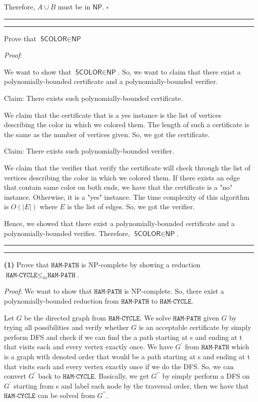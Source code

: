 \documentclass[a4paper, 11pt]{article}
\newcommand{\question}[2] {\vspace{.25in} \hrule\vspace{0.5em}
	\noindent{\bf #1: #2} \vspace{0.5em}
	\hrule \vspace{.10in}}
\renewcommand{\part}[1] {\vspace{.10in} {\bf (#1)}}
\begin{document}
	Therefore, $A \cup B$ must be in $\textsf{NP}$.
	$\square$
	
	\question{3}{This is NP}
	
	Prove that $\textsf{5COLOR} \in \textsf{NP}$
	
	{\em Proof}: 
	
	We want to show that $\textsf{5COLOR} \in \textsf{NP}$. So, we want to claim that there exist a polynomially-bounded certificate and a polynomially-bounded verifier.
	
	Claim: There exists such polynomially-bounded certificate.
	
	We claim that the certificate that is a yes instance is the list of vertices describing the color in which we colored them. The length of such a certificate is the same as the number of vertices given. So, we got the certificate.
	
	Claim: There exists such polynomially-bounded verifier.
	
	We claim that the verifier that verify the certificate will check through the list of vertices describing the color in which we colored them. If there exists an edge that contain same color on both ends, we have that the certificate is a "no" instance. Otherwise, it is a "yes" instance. The time complexity of this algorithm is $O(|E|)$ where $E$ is the list of edges. So, we got the verifier.
	
	Hence, we showed that there exist a polynomially-bounded certificate and a polynomially-bounded verifier. Therefore, $\textsf{5COLOR} \in \textsf{NP}$.
		
	\question{4}{NP-Complete}
	
	\part{1} Prove that $\texttt{HAM-PATH}$ is NP-complete by showing a reduction $\texttt{HAM-CYCLE} \leq_m \texttt{HAM-PATH}$.

	{\em Proof}:  We want to show that $\texttt{HAM-PATH}$ is NP-complete. So, there exist a polynomially-bounded reduction from $\texttt{HAM-PATH}$ to $\texttt{HAM-CYCLE}$. 
	
	Let $G$ be the directed graph from $\texttt{HAM-CYCLE}$. We solve $\texttt{HAM-PATH}$ given $G$ by trying all possibilities and verify whether $G$ is an acceptable certificate by simply perform DFS and check if we can find the a path starting at s and ending at t that visits each and every vertex exactly once. We have $G^\prime$ from $\texttt{HAM-PATH}$ which is a graph with denoted order that would be a path starting at s and ending at t that visits each and every vertex exactly once if we do the DFS. So, we can convert $G^\prime$ back to $\texttt{HAM-CYCLE}$. Basically, we get $G^{\prime \prime}$ by simply perform a DFS on $G^\prime$ starting from s and label each node by the traversal order, then we have that $\texttt{HAM-CYCLE}$ can be solved from $G^{\prime \prime}$.
	
\end{document}
